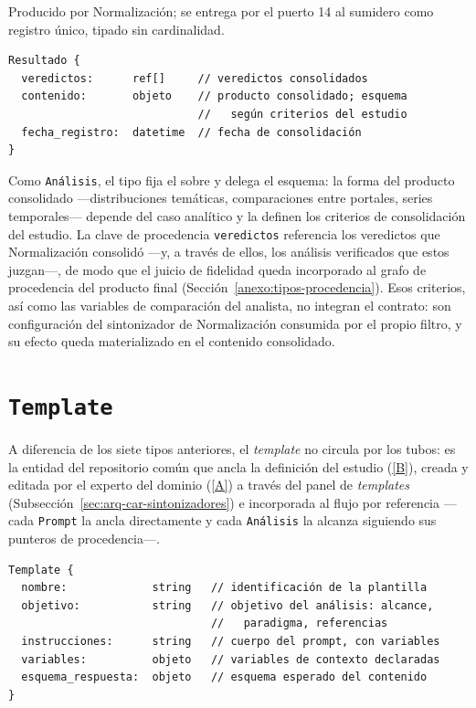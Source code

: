 \documentclass[12pt]{report}
\DeclareRobustCommand{\resp}[1]{\hyperref[tab:registro-responsabilidades]{\textcolor{respcolor}{[#1]}}}
\begin{document}
Producido por Normalización; se entrega por el puerto 14 al sumidero como registro único, tipado sin cardinalidad.

\noindent\begin{minipage}{\linewidth}
  \begin{lstlisting}[style=tipoanexo]
Resultado {
  veredictos:      ref[]     // veredictos consolidados
  contenido:       objeto    // producto consolidado; esquema
                             //   según criterios del estudio
  fecha_registro:  datetime  // fecha de consolidación
}
\end{lstlisting}
\end{minipage}

Como \texttt{Análisis}, el tipo fija el sobre y delega el esquema: la forma del producto consolidado ---distribuciones temáticas, comparaciones entre portales, series temporales--- depende del caso analítico y la definen los criterios de consolidación del estudio. La clave de procedencia \texttt{veredictos} referencia los veredictos que Normalización consolidó ---y, a través de ellos, los análisis verificados que estos juzgan---, de modo que el juicio de fidelidad queda incorporado al grafo de procedencia del producto final (Sección~\ref{anexo:tipos-procedencia}). Esos criterios, así como las variables de comparación del analista, no integran el contrato: son configuración del sintonizador de Normalización consumida por el propio filtro, y su efecto queda materializado en el contenido consolidado.

\section{\texorpdfstring{\texttt{Template}}{Template}}
\label{anexo:tipo-template}

A diferencia de los siete tipos anteriores, el \textit{template} no circula por los tubos: es la entidad del repositorio común que ancla la definición del estudio (\resp{B}), creada y editada por el experto del dominio (\resp{A}) a través del panel de \textit{templates} (Subsección~\ref{sec:arq-car-sintonizadores}) e incorporada al flujo por referencia ---cada \texttt{Prompt} la ancla directamente y cada \texttt{Análisis} la alcanza siguiendo sus punteros de procedencia---.

\noindent\begin{minipage}{\linewidth}
  \begin{lstlisting}[style=tipoanexo]
Template {
  nombre:             string   // identificación de la plantilla
  objetivo:           string   // objetivo del análisis: alcance,
                               //   paradigma, referencias
  instrucciones:      string   // cuerpo del prompt, con variables
  variables:          objeto   // variables de contexto declaradas
  esquema_respuesta:  objeto   // esquema esperado del contenido
}
\end{lstlisting}
\end{minipage}
\end{document}
